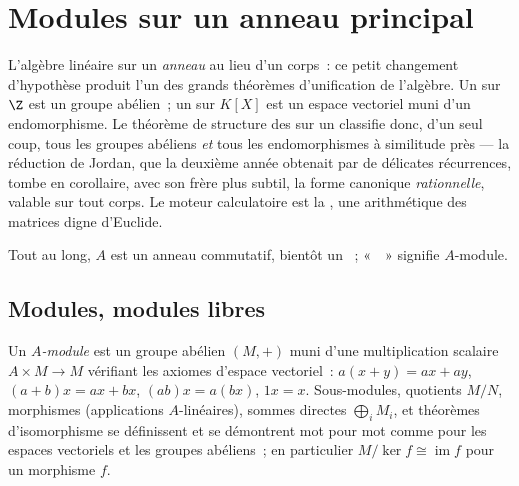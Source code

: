 \chapter{Modules sur un anneau principal}\label{ch:b3:modules}

L'algèbre linéaire sur un \emph{anneau} au lieu d'un corps~: ce
petit changement d'hypothèse produit l'un des grands théorèmes
d'unification de l'algèbre. Un  sur $\Z$ est un groupe
abélien~; un  sur $K[X]$ est un espace vectoriel muni d'un
endomorphisme. Le théorème de structure des 
sur un  classifie donc, d'un seul coup, tous les groupes
abéliens  \emph{et} tous les endomorphismes à
similitude près --- la réduction de Jordan, que la deuxième année
obtenait par de délicates récurrences, tombe en corollaire, avec
son frère plus subtil, la forme canonique \emph{rationnelle},
valable sur tout corps. Le moteur calculatoire est la , une arithmétique des matrices digne d'Euclide.

Tout au long, $A$ est un anneau commutatif, bientôt un ~;
«~~» signifie $A$-module.

\section{Modules, modules libres}

\begin{definition}\label{def:b3:modules:module}
Un \emph{$A$-module} est un groupe abélien $(M, +)$
muni d'une multiplication scalaire $A \times M \to M$ vérifiant
les axiomes d'espace vectoriel~: $a(x + y) = ax + ay$, $(a + b)x
= ax + bx$, $(ab)x = a(bx)$, $1x = x$. Sous-modules, quotients
$M/N$, morphismes (applications $A$-linéaires), sommes directes
$\bigoplus_i M_i$, et théorèmes d'isomorphisme se définissent et
se démontrent mot pour mot comme pour les espaces vectoriels et
les groupes abéliens~; en particulier $M/\ker f \cong
\operatorname{im} f$ pour un morphisme $f$.
\end{definition}

